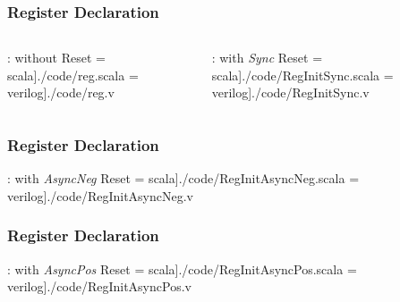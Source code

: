 \begin{frame}
  \frametitle{Register Declaration}

  \begin{columns}[T]
    \begin{column}{0.5\textwidth}
      : without Reset
       = scala]{./code/reg.scala }
       = verilog]{./code/reg.v }
    \end{column}
    \begin{column}{0.5\textwidth}
      : with \emph{Sync} Reset
       = scala]{./code/RegInitSync.scala }
       = verilog]{./code/RegInitSync.v }
    \end{column}
  \end{columns}

\end{frame}

\begin{frame}
  \frametitle{Register Declaration}

  : with \emph{AsyncNeg} Reset
   = scala]{./code/RegInitAsyncNeg.scala }
   = verilog]{./code/RegInitAsyncNeg.v }

\end{frame}

\begin{frame}
  \frametitle{Register Declaration}

  : with \emph{AsyncPos} Reset
   = scala]{./code/RegInitAsyncPos.scala }
   = verilog]{./code/RegInitAsyncPos.v }

\end{frame}

